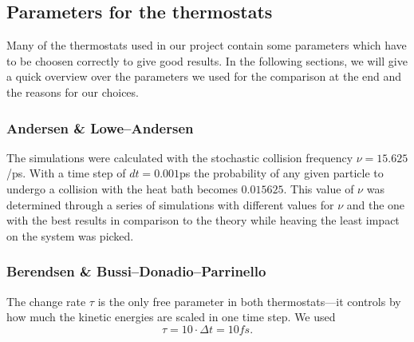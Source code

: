 % 
\graphicspath{{../graphics/}}

\subsection{Parameters for the thermostats}
Many of the thermostats used in our project contain some parameters which have to be choosen correctly to give good results. In the following sections, we will give a quick overview over the parameters we used for the comparison at the end and the reasons for our choices. 
\subsubsection{Andersen \& Lowe--Andersen}
The simulations were calculated with the stochastic collision frequency $\nu = 15.625$/ps. With a time step of $dt=0.001$ps the probability of any given particle to undergo a collision with the heat bath becomes $0.015625$. This value of $\nu$ was determined through a series of simulations with different values for $\nu$ and the one with the best results in comparison to the theory while heaving the least impact on the system was picked.

\subsubsection{Berendsen \& Bussi--Donadio--Parrinello}
The change rate $\tau$ is the only free parameter in both thermostats---it controls by how much the kinetic energies are scaled in one time step. We used 
\begin{equation}
\tau = 10\cdot \Delta t = 10fs\text{.}
\end{equation}

